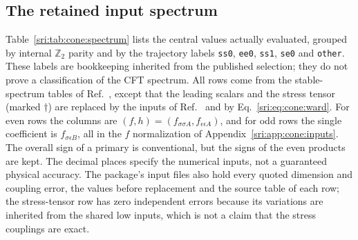 \subsection{The retained input spectrum}\label{sri:app:cone:spectrum}
Table~\ref{sri:tab:cone:spectrum} lists the central values actually evaluated, grouped by internal $\mathbb Z_2$ parity and
by the trajectory labels \texttt{ss0}, \texttt{ee0}, \texttt{ss1}, \texttt{se0} and \texttt{other}. These labels are
bookkeeping inherited from the published selection; they do not prove a classification of the CFT spectrum. All rows
come from the stable-spectrum tables of Ref.~\cite{sri:Simmons-Duffin:2016wlq}, except that the leading scalars and the
stress tensor (marked $\dagger$) are replaced by the inputs of Ref.~\cite{sri:Chang:2024whx} and by
Eq.~\eqref{sri:eq:cone:ward}. For even rows the columns are $(f,h)=(f_{\sigma\sigma A},f_{\epsilon\epsilon A})$, and for odd
rows the single coefficient is $f_{\sigma\epsilon B}$, all in the $f$ normalization of Appendix~\ref{sri:app:cone:inputs}. The
overall sign of a primary is conventional, but the signs of the even products are kept. The decimal places specify the
numerical inputs, not a guaranteed physical accuracy. The package's input files also hold every quoted dimension and
coupling error, the values before replacement and the source table of each row; the stress-tensor row has zero
independent errors because its variations are inherited from the shared low inputs, which is not a claim that the
stress couplings are exact.

